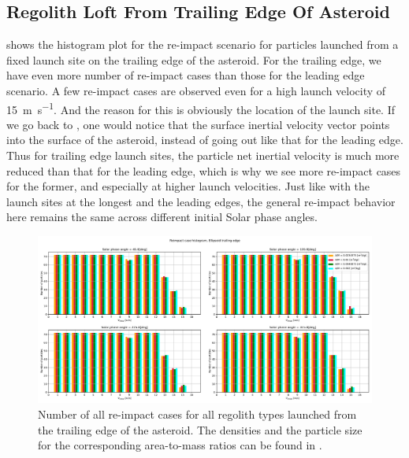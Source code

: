 \subsection{Regolith Loft From Trailing Edge Of Asteroid}
\label{sec:general_char_trailingEdge}
 shows the histogram plot for the re-impact scenario for particles launched from a fixed launch site on the trailing edge of the asteroid. For the trailing edge, we have even more number of re-impact cases than those for the leading edge scenario. A few re-impact cases are observed even for a high launch velocity of \SI{15}{\metre\per\second}. And the reason for this is obviously the location of the launch site. If we go back to , one would notice that the surface inertial velocity vector points into the surface of the asteroid, instead of going out like that for the leading edge. Thus for trailing edge launch sites, the particle net inertial velocity is much more reduced than that for the leading edge, which is why we see more re-impact cases for the former, and especially at higher launch velocities. Just like with the launch sites at the longest and the leading edges, the general re-impact behavior here remains the same across different initial Solar phase angles.
\begin{figure}[!h]
\centering
\captionsetup{justification=centering}
\includegraphics[angle=90, width=\textwidth, height=\textheight, keepaspectratio=true]{trailing_edge_perturbations/allReimpactCases.pdf}
\caption{Number of all re-impact cases for all regolith types launched from the trailing edge of the asteroid. The densities and the particle size for the corresponding area-to-mass ratios can be found in .}
\label{fig:trailingEdge_allParticles_reimpact_hist}
\end{figure}
\FloatBarrier
